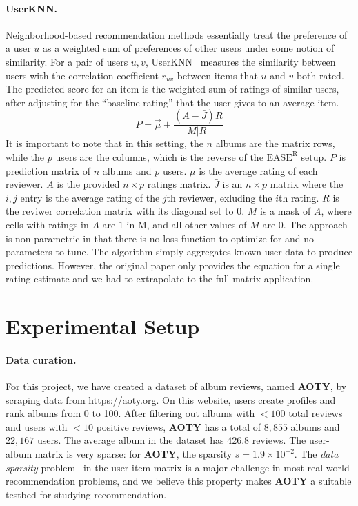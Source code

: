 \documentclass{article}
\newcommand{\aoty}{{\bf AOTY}\xspace}
\newcommand{\card}[1]{\ensuremath{\lvert {#1} \rvert}}
\newcommand{\easer}{$\text{EASE}^\text{R}$\xspace}
\newcommand{\userknn}{UserKNN\xspace}
\begin{document}
\paragraph*{\userknn.}
Neighborhood-based recommendation methods essentially treat the preference of a
 user $u$ as a weighted sum of preferences of other users under some notion of
 similarity.
For a pair of users $u, v$,
 \userknn~\citep{resnickGroupLensOpenArchitecture1994} measures the similarity
 between users with the correlation coefficient $r_{uv}$ between items that $u$
 and $v$ both rated.
The predicted score for an item is the weighted sum of ratings of similar
 users, after adjusting for the ``baseline rating'' that the user gives to an
 average item.
\begin{equation}
P = \vec{\mu} + \frac{(A - \bar J)R}{M \card{R}} \end{equation} It is important
 to note that in this setting, the $n$ albums are the matrix rows, while the $p$
 users are the columns, which is the reverse of the \easer setup.
$P$ is prediction matrix of $n$ albums and $p$ users.
$\mu$ is the average
rating
of each reviewer. $A$ is the provided $n \times p$ ratings matrix. $\bar J$ is
an $n \times p$
matrix where the $i,j$ entry is the average rating of the $j$th reviewer,
exluding the $i$th
rating. $R$ is the reviwer correlation matrix with its diagonal set to 0. $M$
is
a mask of
$A$, where cells with ratings in $A$ are $1$ in M, and all other values of $M$
are 0.
The approach is non-parametric in that there is no loss function to optimize
 for and no parameters to tune.
The algorithm simply aggregates known user data to produce predictions.
However, the original paper only provides the equation for a single rating
 estimate and we had to extrapolate to the full matrix application.

\section{Experimental Setup}
\label{sec:setup}
\paragraph*{Data curation.}
For this project, we have created a dataset of album reviews, named \aoty, by
 scraping data from \url{https://aoty.org}.
On this website, users create profiles and rank albums from 0 to 100.
After filtering out albums with $<100$ total reviews and users with $<10$
 positive reviews, \aoty has a total of $8,855$ albums and $22,167$ users.
The average album in the dataset has $426.8$ reviews.
The user-album matrix is very sparse: for \aoty, the sparsity $s = 1.9 \times
	 10^{-2}$.
The {\em data sparsity} problem~\citep{suSurveyCollaborativeFiltering2009} in
 the user-item matrix is a major challenge in most real-world recommendation
 problems, and we believe this property makes \aoty a suitable testbed for
 studying recommendation.
\end{document}
